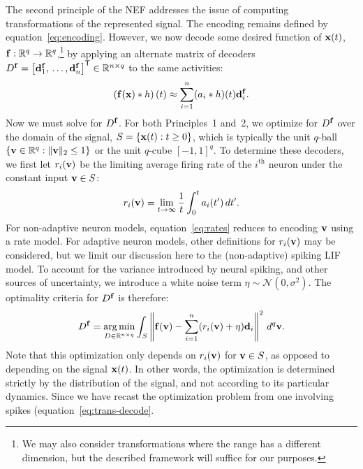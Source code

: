 The second principle of the NEF addresses the issue of computing transformations of the represented signal.
The encoding remains defined by equation~\ref{eq:encoding}.
However, we now decode some desired function of $\mathbf{x}(t)$, $\mathbf{f} : \mathbb{R}^q \rightarrow \mathbb{R}^q$,\footnote{
We may also consider transformations where the range has a different dimension, but the described framework will suffice for our purposes.}
by applying an alternate matrix of decoders $D^{\mathbf{f}} = {\left[ \mathbf{d}^{\mathbf{f}}_1\text{,}\, \ldots\text{,}\, \mathbf{d}^{\mathbf{f}}_n \right]}^\mathsf{T} \in \mathbb{R}^{n \times q}$ to the same activities:
\begin{equation} \label{eq:trans-decode}
\left( \mathbf{f}(\mathbf{x}) \ast h \right)(t) \approx \sum_{i=1}^n (a_i \ast h)(t) \mathbf{d}^{\mathbf{f}}_i \text{.}
\end{equation}
Now we must solve for $D^{\mathbf{f}}$. For both Principles~1 and~2, we optimize for $D^{\mathbf{f}}$ over the domain of the signal, $S = \{\mathbf{x}(t) : t \ge 0\}$, which is typically the unit $q$-ball $\{ \mathbf{v} \in \mathbb{R}^q : \|\mathbf{v}\|_2 \le 1\}$ or the unit $q$-cube $[-1\text{,}\, 1]^q$.
To determine these decoders, we first let $r_i(\mathbf{v})$ be the limiting average firing rate of the $i^{\text{th}}$ neuron under the constant input $\mathbf{v} \in S$:
\begin{equation} \label{eq:rates}
r_i(\mathbf{v}) = \lim_{t \rightarrow \infty} \frac{1}{t} \int_{0}^t a_i(t') \, dt' \text{.}
\end{equation}
For non-adaptive neuron models, equation~\ref{eq:rates} reduces to encoding $\mathbf{v}$ using a rate model.
For adaptive neuron models, other definitions for $r_i(\mathbf{v})$ may be considered, but we limit our discussion here to the (non-adaptive) spiking LIF model.
To account for the variance introduced by neural spiking, and other sources of uncertainty, we introduce a white noise term $\eta \sim \mathcal{N}(0, \sigma^2)$.
The optimality criteria for $D^{\mathbf{f}}$ is therefore:
\begin{equation} \label{eq:decoder_solution}
D^{\mathbf{f}} = \operatorname*{arg\,min}_{D \in \mathbb{R}^{n \times q}} \int_{S} \left\| \mathbf{f}(\mathbf{v}) - \sum_{i=1}^n (r_i(\mathbf{v}) + \eta) \mathbf{d}_i \right\|^2 \, d^q\mathbf{v} \text{.}
\end{equation}
Note that this optimization only depends on $r_i(\mathbf{v})$ for $\mathbf{v} \in S$, as opposed to depending on the signal $\mathbf{x}(t)$.
In other words, the optimization is determined strictly by the distribution of the signal, and not according to its particular dynamics.
Since we have recast the optimization problem from one involving spikes (equation~\ref{eq:trans-decode}.
